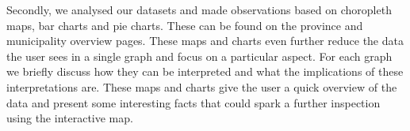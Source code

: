 \documentclass[a4paper,11pt]{article}
\begin{document}
Secondly, we analysed our datasets and made observations based on choropleth maps, bar charts and pie charts. These can be found on the province and municipality overview pages. These maps and charts even further reduce the data the user sees in a single graph and focus on a particular aspect. For each graph we briefly discuss how they can be interpreted and what the implications of these interpretations are. These maps and charts give the user a quick overview of the data and present some interesting facts that could spark a further inspection using the interactive map.
\end{document}
